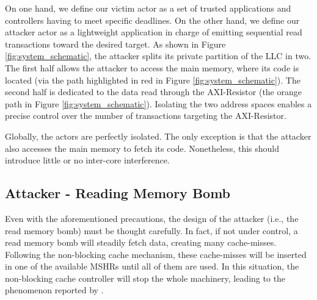         On one hand, we define our victim actor as a set of trusted applications and controllers having to meet specific deadlines.
        On the other hand, we define our attacker actor as a lightweight application in charge of emitting sequential read transactions toward the desired target.
        As shown in Figure \ref{fig:system_schematic}, the attacker splits its private partition of the LLC in two.
        The first half allows the attacker to access the main memory, where its code is located (via the path highlighted in red in Figure \ref{fig:system_schematic}). The second half is dedicated to the data read through the AXI-Resistor (the orange path in Figure \ref{fig:system_schematic}).
        Isolating the two address spaces enables a precise control over the number of transactions targeting the AXI-Resistor.

        Globally, the actors are perfectly isolated.
        The only exception is that the attacker also accesses the main memory to fetch its code.
        Nonetheless, this should introduce little or no inter-core interference.

    \subsection{Attacker - Reading Memory Bomb}
        \label{subsec:attacker_reading_memory_bomb}

        Even with the aforementioned precautions, the design of the attacker (i.e., the read memory bomb) must be thought carefully.
        In fact, if not under control, a read memory bomb will steadily fetch data, creating many cache-misses.
        Following the non-blocking cache mechanism, these cache-misses will be inserted in one of the available MSHRs until all of them are used.
        In this situation, the non-blocking cache controller will stop the whole machinery, leading to the phenomenon reported by \cite{Heechul_DDOS_attacks_on_shared_cache}.

